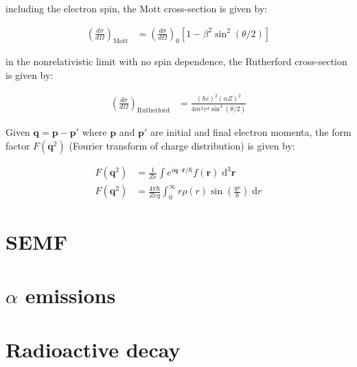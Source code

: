\documentclass[10pt]{article}
\theoremstyle{definition}
\begin{document}
including the electron spin, the Mott cross-section is given by:

\begin{align}
    \left(\frac{d\sigma}{d\Omega}\right)_{\text{Mott}} &=
    \left(\frac{d\sigma}{d\Omega}\right)_0 [1-\beta^2\sin^2(\theta/2)]
\end{align}

in the nonrelativistic limit with no spin dependence, the Rutherford cross-section is given by:

\begin{align}
    \left(\frac{d\sigma}{d\Omega}\right)_{\text{Rutherford}} &=
    \frac{(\hbar c)^2 (\alpha Z)^2}{4m^2 v^4 \sin^4(\theta/2)}
\end{align}

Given $\mathbf{q} = \mathbf{p} - \mathbf{p}'$ where $\mathbf{p}$ and $\mathbf{p}'$ are initial and final electron momenta, the form factor $F(\mathbf{q}^2)$ (Fourier transform of charge distribution) is given by:

\begin{align}
    F(\mathbf{q}^2) &= \frac{1}{Ze} \int e^{i\mathbf{q}\cdot\mathbf{r}/\hbar} f(\mathbf{r})\; \text{d}^3\mathbf{r}\\
    F(\mathbf{q}^2) &= \frac{4\pi\hbar}{Zeq}\int_{0}^{\infty} r \rho(r) \sin\left(\frac{qr}{\hbar}\right)\;\text{d}r
\end{align}

\section*{SEMF}%


\section*{$\alpha$ emissions}%
\section*{Radioactive decay}%
\end{document}
